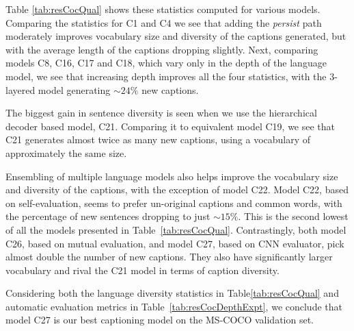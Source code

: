 Table \ref{tab:resCocQual} shows these statistics computed for various
models. 
Comparing the statistics for C1 and C4 we see that adding the \emph{persist} path
moderately improves vocabulary size and diversity of the captions generated,
but with the average length of the captions dropping slightly.
Next, comparing models C8, C16, C17 and C18, which vary only in the depth of the
language model, we see that increasing depth improves all the four statistics,
with the 3-layered model generating $\sim24\%$ new captions.

The biggest gain in sentence diversity is seen when we use the hierarchical
decoder based model, C21. 
Comparing it to equivalent model C19, we see that C21 generates almost twice as
many new captions, using a vocabulary of approximately the same size.

Ensembling of multiple language models also helps improve the vocabulary size
and diversity of the captions, with the exception of model C22.
Model C22, based on self-evaluation, seems to prefer un-original captions and
common words, with the percentage of new sentences dropping to just $\sim15\%$.
This is the second lowest of all the models presented in
Table~\ref{tab:resCocQual}.
Contrastingly, both model C26, based on mutual evaluation, and model C27, based on CNN
evaluator, pick almost double the number of new captions.
They also have significantly larger vocabulary and rival the C21 model in
terms of caption diversity.

Considering both the language diversity statistics in Table\ref{tab:resCocQual}
and automatic evaluation metrics in Table~\ref{tab:resCocDepthExpt}, we conclude
that model C27 is our best captioning model on the MS-COCO validation set.
